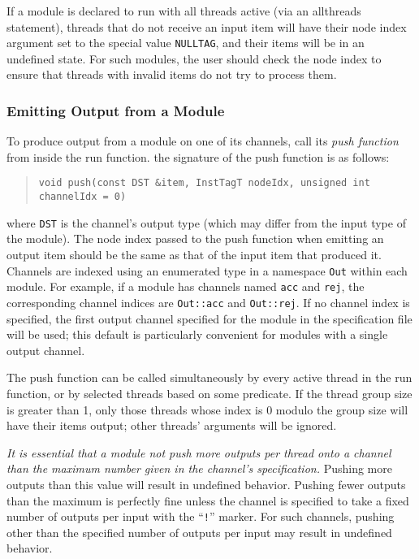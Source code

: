 \documentclass[11pt]{article}
\begin{document}
If a module is declared to run with all threads active (via an
allthreads statement), threads that do not receive an input item will
have their node index argument set to the special value
\texttt{NULLTAG}, and their items will be in an undefined state.  For
such modules, the user should check the node index to ensure that
threads with invalid items do not try to process them.


\subsubsection{Emitting Output from a Module}

To produce output from a module on one of its channels, call its
\textit{push function} from inside the run function.  the signature
of the push function is as follows:
\begin{quote}
\texttt{void push(const DST \&item, InstTagT nodeIdx, unsigned int channelIdx = 0)}
\end{quote}
where \texttt{DST} is the channel's output type (which may differ from
the input type of the module).  The node index passed to the push function
when emitting an output item should be the same as that of the input
item that produced it.  Channels are indexed using an enumerated type
in a namespace \texttt{Out} within each module.  For example, if a
module has channels named \texttt{acc} and \texttt{rej}, the
corresponding channel indices are \texttt{Out::acc} and
\texttt{Out::rej}.  If no channel index is specified, the first
output channel specified for the module in the specification file
will be used; this default is particularly convenient for modules
with a single output channel.

The push function can be called simultaneously by every active thread
in the run function, or by selected threads based on some predicate.
If the thread group size is greater than 1, only those threads whose
index is 0 modulo the group size will have their items output; other
threads' arguments will be ignored.

\emph{It is essential that a module not push more outputs per thread
  onto a channel than the maximum number given in the channel's
  specification.}  Pushing more outputs than this value will result in
undefined behavior.  Pushing fewer outputs than the maximum is
perfectly fine unless the channel is specified to take a fixed number
of outputs per input with the ``\texttt{!}'' marker. For such
channels, pushing other than the specified number of outputs per input
may result in undefined behavior.
\end{document}
